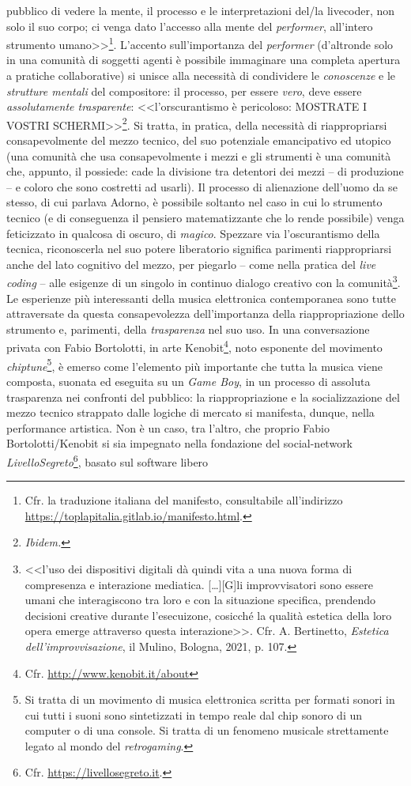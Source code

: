 \documentclass[a4paper,12pt]{scrartcl}
\newcommand{\omissis}{[\dots\unkern]}
\begin{document}
pubblico di vedere la mente, il processo e le interpretazioni del/la livecoder, non solo il suo corpo; ci venga dato l'accesso alla mente del \emph{performer}, all'intero strumento umano>>\footnote{Cfr. la traduzione italiana del manifesto, consultabile all'indirizzo \url{https://toplapitalia.gitlab.io/manifesto.html}.}. L'accento sull'importanza del \emph{performer} (d'altronde solo in una comunità di soggetti agenti è possibile immaginare una completa apertura a pratiche collaborative) si unisce alla necessità di condividere le \emph{conoscenze} e le \emph{strutture mentali} del compositore: il processo, per essere \emph{vero}, deve essere \emph{assolutamente trasparente}: <<l'orscurantismo è pericoloso: MOSTRATE I VOSTRI SCHERMI>>\footnote{\textit{Ibidem.}}. Si tratta, in pratica, della necessità di riappropriarsi consapevolmente del mezzo tecnico, del suo potenziale emancipativo ed utopico (una comunità che usa consapevolmente i mezzi e gli strumenti è una comunità che, appunto, il possiede: cade la divisione tra detentori dei mezzi -- di produzione -- e coloro che sono costretti ad usarli). Il processo di alienazione dell'uomo da se stesso, di cui parlava Adorno, è possibile soltanto nel caso in cui lo strumento tecnico (e di conseguenza il pensiero matematizzante che lo rende possibile) venga feticizzato in qualcosa di oscuro, di \emph{magico}. Spezzare via l'oscurantismo della tecnica, riconoscerla nel suo potere liberatorio significa parimenti riappropriarsi anche del lato cognitivo del mezzo, per piegarlo -- come nella pratica del \emph{live coding} -- alle esigenze di un singolo in continuo dialogo creativo con la comunità\footnote{<<l'uso dei dispositivi digitali dà quindi vita a una nuova forma di compresenza e interazione mediatica. \omissis [G]li improvvisatori sono essere umani che interagiscono tra loro e con la situazione specifica, prendendo decisioni creative durante l'esecuizone, cosicché la qualità estetica della loro opera emerge attraverso questa interazione>>. Cfr. A. Bertinetto, \textit{Estetica dell'improvvisazione}, il Mulino, Bologna, 2021, p. 107.}. Le esperienze più interessanti della musica elettronica contemporanea sono tutte attraversate da questa consapevolezza dell'importanza della riappropriazione dello strumento e, parimenti, della \emph{trasparenza} nel suo uso. In una conversazione privata con Fabio Bortolotti, in arte Kenobit\footnote{Cfr. \url{http://www.kenobit.it/about}}, noto esponente del movimento \emph{chiptune}\footnote{Si tratta di un movimento di musica elettronica scritta per formati sonori in cui tutti i suoni sono sintetizzati in tempo reale dal chip sonoro di un computer o di una console. Si tratta di un fenomeno musicale strettamente legato al mondo del \emph{retrogaming}.}, è emerso come l'elemento più importante che tutta la musica viene composta, suonata ed eseguita su un \textit{Game Boy}, in un processo di assoluta trasparenza nei confronti del pubblico: la riappropriazione e la socializzazione del mezzo tecnico strappato dalle logiche di mercato si manifesta, dunque, nella performance artistica. Non è un caso, tra l'altro, che proprio Fabio Bortolotti/Kenobit si sia impegnato nella fondazione del social-network \textit{LivelloSegreto}\footnote{Cfr. \url{https://livellosegreto.it}.}, basato sul software libero 
\end{document}
